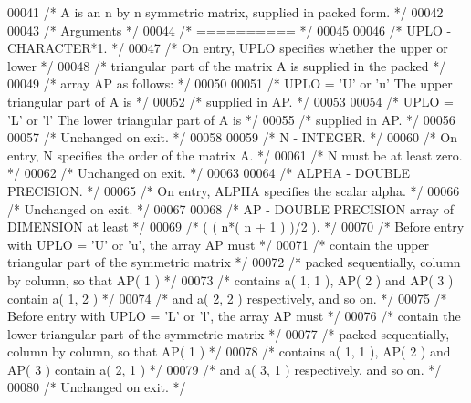 \begin{DoxyCode}
00041 \textcolor{comment}{/*  A is an n by n symmetric matrix, supplied in packed form. */}
00042 
00043 \textcolor{comment}{/*  Arguments */}
00044 \textcolor{comment}{/*  ========== */}
00045 
00046 \textcolor{comment}{/*  UPLO   - CHARACTER*1. */}
00047 \textcolor{comment}{/*           On entry, UPLO specifies whether the upper or lower */}
00048 \textcolor{comment}{/*           triangular part of the matrix A is supplied in the packed */}
00049 \textcolor{comment}{/*           array AP as follows: */}
00050 
00051 \textcolor{comment}{/*              UPLO = 'U' or 'u'   The upper triangular part of A is */}
00052 \textcolor{comment}{/*                                  supplied in AP. */}
00053 
00054 \textcolor{comment}{/*              UPLO = 'L' or 'l'   The lower triangular part of A is */}
00055 \textcolor{comment}{/*                                  supplied in AP. */}
00056 
00057 \textcolor{comment}{/*           Unchanged on exit. */}
00058 
00059 \textcolor{comment}{/*  N      - INTEGER. */}
00060 \textcolor{comment}{/*           On entry, N specifies the order of the matrix A. */}
00061 \textcolor{comment}{/*           N must be at least zero. */}
00062 \textcolor{comment}{/*           Unchanged on exit. */}
00063 
00064 \textcolor{comment}{/*  ALPHA  - DOUBLE PRECISION. */}
00065 \textcolor{comment}{/*           On entry, ALPHA specifies the scalar alpha. */}
00066 \textcolor{comment}{/*           Unchanged on exit. */}
00067 
00068 \textcolor{comment}{/*  AP     - DOUBLE PRECISION array of DIMENSION at least */}
00069 \textcolor{comment}{/*           ( ( n*( n + 1 ) )/2 ). */}
00070 \textcolor{comment}{/*           Before entry with UPLO = 'U' or 'u', the array AP must */}
00071 \textcolor{comment}{/*           contain the upper triangular part of the symmetric matrix */}
00072 \textcolor{comment}{/*           packed sequentially, column by column, so that AP( 1 ) */}
00073 \textcolor{comment}{/*           contains a( 1, 1 ), AP( 2 ) and AP( 3 ) contain a( 1, 2 ) */}
00074 \textcolor{comment}{/*           and a( 2, 2 ) respectively, and so on. */}
00075 \textcolor{comment}{/*           Before entry with UPLO = 'L' or 'l', the array AP must */}
00076 \textcolor{comment}{/*           contain the lower triangular part of the symmetric matrix */}
00077 \textcolor{comment}{/*           packed sequentially, column by column, so that AP( 1 ) */}
00078 \textcolor{comment}{/*           contains a( 1, 1 ), AP( 2 ) and AP( 3 ) contain a( 2, 1 ) */}
00079 \textcolor{comment}{/*           and a( 3, 1 ) respectively, and so on. */}
00080 \textcolor{comment}{/*           Unchanged on exit. */}

\end{DoxyCode}
